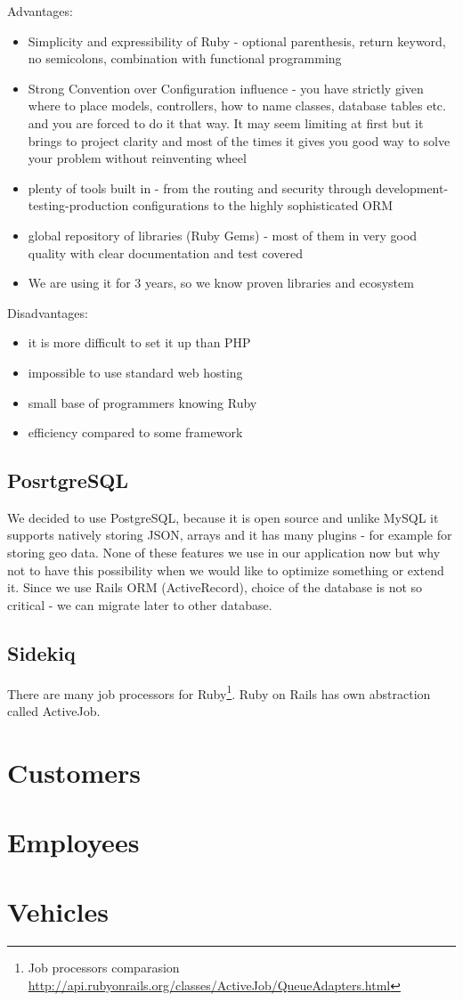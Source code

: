Advantages:
\begin{itemize}
	\item Simplicity and expressibility of Ruby - optional parenthesis, return keyword, no semicolons, combination with functional programming 
	\item Strong Convention over Configuration influence - you have strictly given where to place models, controllers, how to name classes, database tables etc. and you are forced to do it that way. It may seem limiting at first but it brings to project clarity and most of the times it gives you good way to solve your problem without reinventing wheel
	\item plenty of tools built in - from the routing and security through development-testing-production configurations to the highly sophisticated ORM
	\item global repository of libraries (Ruby Gems) - most of them in very good quality with clear documentation and test covered
	\item We are using it for 3 years, so we know proven libraries and ecosystem
\end{itemize} 
Disadvantages:
\begin{itemize}
	\item it is more difficult to set it up than PHP
	\item impossible to use standard web hosting
	\item small base of programmers knowing Ruby
	\item efficiency compared to some framework 
\end{itemize}
  
\subsection{PosrtgreSQL}
We decided to use PostgreSQL, because it is open source and unlike MySQL it supports natively storing JSON, arrays and it has many plugins - for example for storing geo data. None of these features we use in our application now but why not to have this possibility when we would like to optimize something or extend it. Since we use Rails ORM (ActiveRecord), choice of the database is not so critical - we can migrate later to other database.
\subsection{Sidekiq}
There are many job processors for Ruby\footnote{ Job processors comparasion \url{http://api.rubyonrails.org/classes/ActiveJob/QueueAdapters.html}}. Ruby on Rails has own abstraction called ActiveJob. 

\section{Customers}
\section{Employees}
\section{Vehicles}

